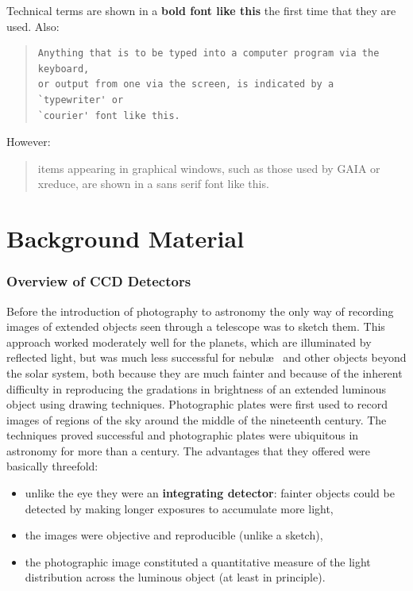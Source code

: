 \documentclass[twoside,11pt]{article}
\newcommand{\stardocinitials}  {SC}
\newcommand{\stardocnumber}    {5.3}
\newcommand{\stardocname}{\stardocinitials /\stardocnumber}
\newcommand{\xlabel}[1]{}
\begin{document}
Technical terms are shown in a {\bf bold font like this} the first
time that they are used.  Also:

\begin{quote}
\begin{verbatim}
Anything that is to be typed into a computer program via the keyboard,
or output from one via the screen, is indicated by a `typewriter' or
`courier' font like this.
\end{verbatim}
\end{quote}

However:

\begin{quote}
{\sf items appearing in graphical windows, such as those used by GAIA
or xreduce, are shown in a sans serif font like this.}
\end{quote}


\cleardoublepage
\markboth{\stardocname}{\stardocname}
\part{Background Material}
\markboth{\stardocname}{\stardocname}
\section{\xlabel{WHAT}\label{WHAT}Overview of CCD Detectors}

Before the introduction of photography to astronomy the only way of
recording images of extended objects seen through a telescope was to
sketch them.  This approach worked moderately well for the planets, which
are illuminated by reflected light, but was much less successful for
nebul\ae~ and other objects beyond the solar system, both because they
are much fainter and because of the inherent difficulty in reproducing
the gradations in brightness of an extended luminous object using
drawing techniques.  Photographic plates were first used to record images
of regions of the sky around the middle of the nineteenth century.  The
techniques proved successful and photographic plates were ubiquitous in
astronomy for more than a century.  The advantages that they offered
were basically threefold:

\begin{itemize}

  \item unlike the eye they were an {\bf integrating detector}: fainter
   objects could be detected by making longer exposures to accumulate
   more light,

  \item the images were objective and reproducible (unlike a sketch),

  \item the photographic image constituted a quantitative measure of the
   light distribution across the luminous object (at least in principle).

\end{itemize}
\end{document}
